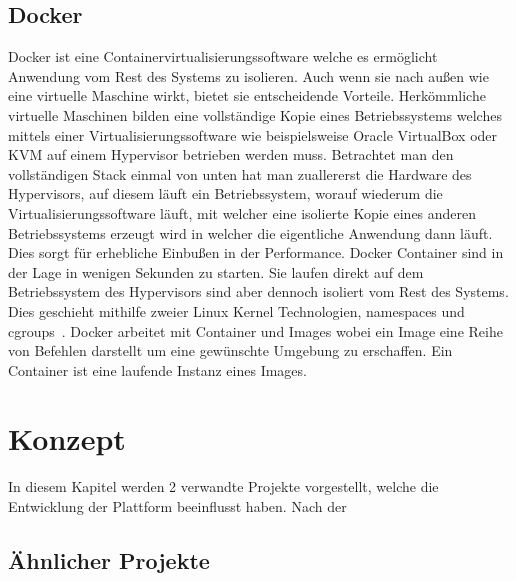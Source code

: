     \section{Docker}\label{sec:docker}
    Docker ist eine Containervirtualisierungssoftware welche es ermöglicht Anwendung vom Rest des Systems zu isolieren.
    Auch wenn sie nach außen wie eine virtuelle Maschine wirkt, bietet sie entscheidende Vorteile.
    Herkömmliche virtuelle Maschinen bilden eine vollständige Kopie eines Betriebssystems welches mittels einer Virtualisierungssoftware wie beispielsweise Oracle VirtualBox oder KVM auf einem Hypervisor betrieben werden muss.
    Betrachtet man den vollständigen Stack einmal von unten hat man zuallererst die Hardware des Hypervisors, auf diesem läuft ein Betriebssystem, worauf wiederum die Virtualisierungssoftware läuft, mit welcher eine isolierte Kopie eines anderen Betriebssystems erzeugt wird in welcher die eigentliche Anwendung dann läuft.
    Dies sorgt für erhebliche Einbußen in der Performance.
    Docker Container sind in der Lage in wenigen Sekunden zu starten.
    Sie laufen direkt auf dem Betriebssystem des Hypervisors sind aber dennoch isoliert vom Rest des Systems.
    Dies geschieht mithilfe zweier Linux Kernel Technologien, namespaces und cgroups~\cite{docker}.
    Docker arbeitet mit Container und Images wobei ein Image eine Reihe von Befehlen darstellt um eine gewünschte Umgebung zu erschaffen.
    Ein Container ist eine laufende Instanz eines Images.


    \chapter{Konzept}\label{ch:konzept}
    In diesem Kapitel werden 2 verwandte Projekte vorgestellt, welche die Entwicklung der Plattform beeinflusst haben.
    Nach der

    \section{Ähnlicher Projekte}\label{sec:analyse-ahnlicher-projekte}

